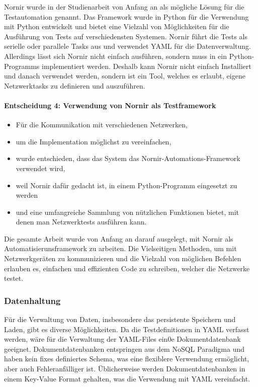 \documentclass[]{subfiles}
\begin{document}
		Nornir wurde in der Studienarbeit von Anfang an als mögliche Lösung für die Testautomation genannt.
		Das Framework wurde in Python für die Verwendung mit Python entwickelt und bietet eine Vielzahl von Möglichkeiten für die Ausführung von Tests auf verschiedensten Systemen.
		Nornir führt die Tests als serielle oder parallele Tasks aus und verwendet YAML für die Datenverwaltung.
		Allerdings lässt sich Nornir nicht einfach ausführen, sondern muss in ein Python-Programms implementiert werden.
		Deshalb kann Nornir nicht einfach Installiert und danach verwendet werden, sondern ist ein Tool, welches es erlaubt, eigene Netzwerktasks zu definieren und auszuführen.



		\paragraph{Entscheidung 4: Verwendung von Nornir als Testframework}
		\begin{itemize}
			\item Für die Kommunikation mit verschiedenen Netzwerken,
			\item um die Implementation möglichst zu vereinfachen,
			\item wurde entschieden, dass das System das Nornir-Automations-Framework verwendet wird,
			\item weil Nornir dafür gedacht ist, in einem Python-Programm eingesetzt zu werden
			\item und eine umfangreiche Sammlung von nützlichen Funktionen bietet, mit denen man Netzwerktests ausführen kann.
		\end{itemize}

		Die gesamte Arbeit wurde von Anfang an darauf ausgelegt, mit Nornir als Automatisierunsframework zu arbeiten.
		Die Vielseitigen Methoden, um mit Netzwerkgeräten zu kommunizieren und die Vielzahl von möglichen Befehlen erlauben es, einfachen und effizienten Code zu schreiben, welcher die Netzwerke testet.
		\newpage

		\subsubsection{Datenhaltung}
		Für die Verwaltung von Daten, insbesondere das persistente Speichern und Laden, gibt es diverse Möglichkeiten.
		Da die Testdefinitionen in YAML verfasst werden, wäre für die Verwaltung der YAML-Files ein0e Dokumentdatenbank geeignet.
		Dokumentdatenbanken entspringen aus dem NoSQL Paradigma und haben kein fixes definiertes Schema, was eine flexiblere Verwendung ermöglicht, aber auch Fehleranfälliger ist.
		Üblicherweise werden Dokumentdatenbanken in einem Key-Value Format gehalten, was die Verwendung mit YAML vereinfacht.
\end{document}
